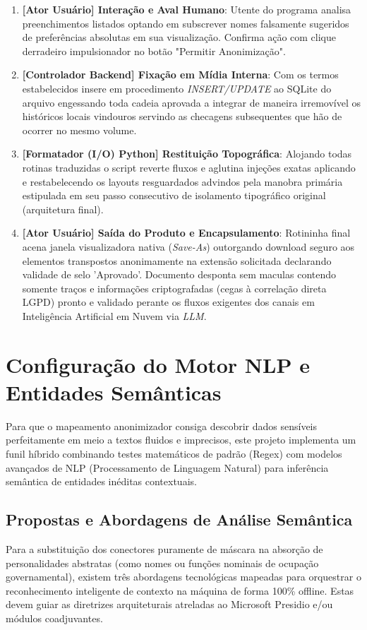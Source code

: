 \documentclass{scrreprt}
\begin{document}
\begin{enumerate}
    \item \textbf{[Ator Usuário] Interação e Aval Humano}: Utente do programa analisa preenchimentos listados optando em subscrever nomes falsamente sugeridos de preferências absolutas em sua visualização. Confirma ação com clique derradeiro impulsionador no botão "Permitir Anonimização".
    \item \textbf{[Controlador Backend] Fixação em Mídia Interna}: Com os termos estabelecidos insere em procedimento \textit{INSERT/UPDATE} ao SQLite do arquivo engessando toda cadeia aprovada a integrar de maneira irremovível os históricos locais vindouros servindo as checagens subsequentes que hão de ocorrer no mesmo volume.
    \item \textbf{[Formatador (I/O) Python] Restituição Topográfica}: Alojando todas rotinas traduzidas o script reverte fluxos e aglutina injeções exatas aplicando e restabelecendo os layouts resguardados advindos pela manobra primária estipulada em seu passo consecutivo de isolamento tipográfico original (arquitetura final).
    \item \textbf{[Ator Usuário] Saída do Produto e Encapsulamento}: Rotininha final acena janela visualizadora nativa (\textit{Save-As}) outorgando download seguro aos elementos transpostos anonimamente na extensão solicitada declarando validade de selo 'Aprovado'. Documento desponta sem maculas contendo somente traços e informações criptografadas (cegas à correlação direta LGPD) pronto e validado perante os fluxos exigentes dos canais em Inteligência Artificial em Nuvem via \textit{LLM}.
\end{enumerate}

\chapter{Configuração do Motor NLP e Entidades Semânticas}

Para que o mapeamento anonimizador consiga descobrir dados sensíveis perfeitamente em meio a textos fluidos e imprecisos, este projeto implementa um funil híbrido combinando testes matemáticos de padrão (Regex) com modelos avançados de NLP (Processamento de Linguagem Natural) para inferência semântica de entidades inéditas contextuais.

\section{Propostas e Abordagens de Análise Semântica}
Para a substituição dos conectores puramente de máscara na absorção de personalidades abstratas (como nomes ou funções nominais de ocupação governamental), existem três abordagens tecnológicas mapeadas para orquestrar o reconhecimento inteligente de contexto na máquina de forma 100\% offline. Estas devem guiar as diretrizes arquiteturais atreladas ao Microsoft Presidio e/ou módulos coadjuvantes.
\end{document}
